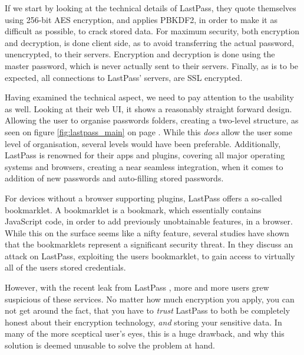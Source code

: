 			If we start by looking at the technical details of LastPass, they quote themselves using 256-bit AES encryption, and applies PBKDF2, in order to make it as difficult as possible, to crack stored data. For maximum security, both encryption and decryption, is done client side\cite{lastpass_cleintsideencryption}, as to avoid transferring the actual password, unencrypted, to their servers. Encryption and decryption is done using the master password, which is never actually sent to their servers. Finally, as is to be expected, all connections to LastPass' servers, are SSL encrypted.

			Having examined the technical aspect, we need to pay attention to the usability as well. Looking at their web UI, it shows a reasonably straight forward design. Allowing the user to organise passwords folders, creating a two-level structure, as seen on figure \ref{fig:lastpass_main} on page \pageref{fig:lastpass_main}. While this \emph{does} allow the user some level of organisation, several levels would have been preferable. Additionally, LastPass is renowned for their apps and plugins, covering all major operating systems and browsers, creating a near seamless integration, when it comes to addition of new passwords and auto-filling stored passwords.

			For devices without a browser supporting plugins, LastPass offers a so-called bookmarklet\cite{lastpass_bookmarklet}. A bookmarklet is a bookmark, which essentially contains JavaScript code, in order to add previously unobtainable features, in a browser. While this on the surface seems like a nifty feature, several studies have shown that the bookmarklets represent a significant security threat. In \cite{bookmarklet} they discuss an attack on LastPass, exploiting the users bookmarklet, to gain access to virtually all of the users stored credentials.

			However, with the recent leak from LastPass \cite{lastpass_leak}, more and more users grew suspicious of these services. No matter how much encryption you apply, you can not get around the fact, that you have to \emph{trust} LastPass to both be completely honest about their encryption technology, \emph{and} storing your sensitive data. In many of the more sceptical user's eyes, this is a huge drawback, and why this solution is deemed unusable to solve the problem at hand.



